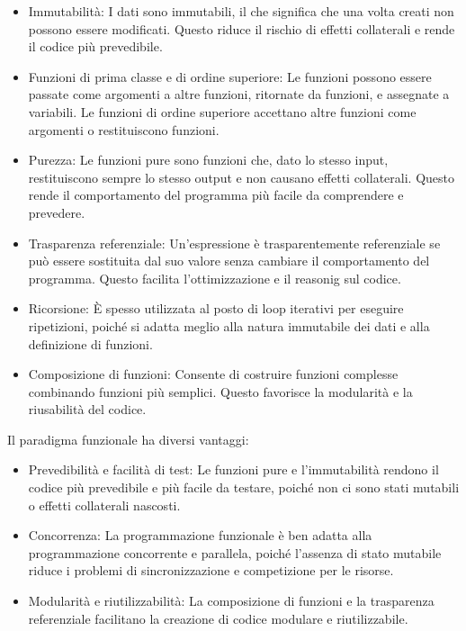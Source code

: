\documentclass[
  letterpaper,
]{scrbook}
\begin{document}
\begin{itemize}
\item
  Immutabilità: I dati sono immutabili, il che significa che una volta
  creati non possono essere modificati. Questo riduce il rischio di
  effetti collaterali e rende il codice più prevedibile.
\item
  Funzioni di prima classe e di ordine superiore: Le funzioni possono
  essere passate come argomenti a altre funzioni, ritornate da funzioni,
  e assegnate a variabili. Le funzioni di ordine superiore accettano
  altre funzioni come argomenti o restituiscono funzioni.
\item
  Purezza: Le funzioni pure sono funzioni che, dato lo stesso input,
  restituiscono sempre lo stesso output e non causano effetti
  collaterali. Questo rende il comportamento del programma più facile da
  comprendere e prevedere.
\item
  Trasparenza referenziale: Un'espressione è trasparentemente
  referenziale se può essere sostituita dal suo valore senza cambiare il
  comportamento del programma. Questo facilita l'ottimizzazione e il
  reasonig sul codice.
\item
  Ricorsione: È spesso utilizzata al posto di loop iterativi per
  eseguire ripetizioni, poiché si adatta meglio alla natura immutabile
  dei dati e alla definizione di funzioni.
\item
  Composizione di funzioni: Consente di costruire funzioni complesse
  combinando funzioni più semplici. Questo favorisce la modularità e la
  riusabilità del codice.
\end{itemize}

Il paradigma funzionale ha diversi vantaggi:

\begin{itemize}
\item
  Prevedibilità e facilità di test: Le funzioni pure e l'immutabilità
  rendono il codice più prevedibile e più facile da testare, poiché non
  ci sono stati mutabili o effetti collaterali nascosti.
\item
  Concorrenza: La programmazione funzionale è ben adatta alla
  programmazione concorrente e parallela, poiché l'assenza di stato
  mutabile riduce i problemi di sincronizzazione e competizione per le
  risorse.
\item
  Modularità e riutilizzabilità: La composizione di funzioni e la
  trasparenza referenziale facilitano la creazione di codice modulare e
  riutilizzabile.
\end{itemize}
\end{document}
